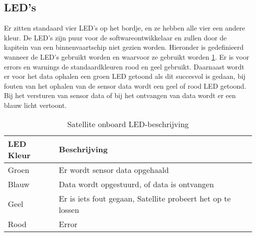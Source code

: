 \subsection{LED's}
Er zitten standaard vier LED’s op het bordje, en ze hebben alle vier een andere kleur. De LED’s zijn puur voor de softwareontwikkelaar en zullen door de kapitein van een binnenvaartschip niet gezien worden. Hieronder is gedefinieerd wanneer de LED’s gebruikt worden en waarvoor ze gebruikt worden \ref{tab:leds}. Er is voor errors en warnings de standaardkleuren rood en geel gebruikt. Daarnaast wordt er voor het data ophalen een groen LED getoond als dit succesvol is gedaan, bij fouten van het ophalen van de sensor data wordt een geel of rood LED getoond. Bij het versturen van sensor data of bij het ontvangen van data wordt er een blauw licht vertoont.
\begin{table}[h!]
	\caption{Satellite onboard LED-beschrijving}
	\begin{tabular}{lp{14.5cm}}
	\toprule
	\textbf{LED Kleur} 	& \textbf{Beschrijving} \\ \toprule
	Groen	& Er wordt sensor data opgehaald\\
	Blauw	& Data wordt opgestuurd, of data is ontvangen \\
	Geel	& Er is iets fout gegaan, Satellite probeert het op te lossen\\  
	Rood	& Error \\ \bottomrule
	\end{tabular}
	\label{tab:leds}
\end{table}